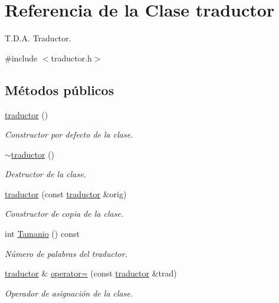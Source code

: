 \hypertarget{classtraductor}{\section{Referencia de la Clase traductor}
\label{classtraductor}
}


T.\-D.\-A. Traductor.  




{\ttfamily \#include $<$traductor.\-h$>$}

\subsection*{Métodos públicos}
\begin{DoxyCompactItemize}
\item 
\hyperlink{classtraductor_ab99562aebb0a518d6e9298bfa9dbadac}{traductor} ()
\begin{DoxyCompactList}\small\item\em Constructor por defecto de la clase. \end{DoxyCompactList}\item 
\hyperlink{classtraductor_a9d3bb37c205eb04dc6f7a0ef6e2d5aa9}{$\sim$traductor} ()
\begin{DoxyCompactList}\small\item\em Destructor de la clase. \end{DoxyCompactList}\item 
\hyperlink{classtraductor_af936ed17ec673c1d48812feaea06eb46}{traductor} (const \hyperlink{classtraductor}{traductor} \&orig)
\begin{DoxyCompactList}\small\item\em Constructor de copia de la clase. \end{DoxyCompactList}\item 
int \hyperlink{classtraductor_a0c07b08c93bd8b8f408716afb6dc0782}{Tamanio} () const 
\begin{DoxyCompactList}\small\item\em Número de palabras del traductor. \end{DoxyCompactList}\item 
\hyperlink{classtraductor}{traductor} \& \hyperlink{classtraductor_ad93a9e15d6ac047bfd2cd5f7f1754d45}{operator=} (const \hyperlink{classtraductor}{traductor} \&trad)
\begin{DoxyCompactList}\small\item\em Operador de asignación de la clase. \end{DoxyCompactList}\item 

\end{DoxyCompactItemize}
